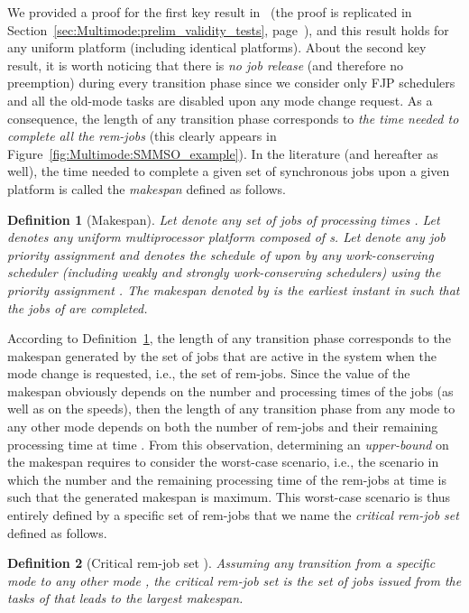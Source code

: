 \documentclass{article}
\newtheorem{Definition}{Definition}
\newtheorem{validity test}{Validity Test}
\begin{document}
We provided a proof for the first key result in~\cite{NelisGoossensAndersson:09} (the proof is replicated in Section~\ref{sec:Multimode:prelim_validity_tests}, page~\pageref{lem:Multimode:remjobs_meet_deadline}), and this result holds for any uniform platform (including identical platforms). About the second key result, it is worth noticing that there is \emph{no job release} (and therefore no preemption) during every transition phase since we consider only FJP schedulers and all the old-mode tasks are disabled upon any mode change request. As a consequence, the length of any transition phase corresponds to \emph{the time needed to complete all the rem-jobs} (this clearly appears in Figure~\ref{fig:Multimode:SMMSO_example}). In the literature (and hereafter as well), the time needed to complete a given set of synchronous jobs upon a given platform is called the \emph{makespan} defined as follows.

\begin{Definition}[Makespan]
\label{def:Multimode:makespan}
Let  denote any set of  jobs of processing times . Let  denotes any uniform multiprocessor platform composed of  s. Let  denote any job priority assignment and  denotes the schedule of  upon  by any work-conserving scheduler (including weakly and strongly work-conserving schedulers) using the priority assignment . The makespan denoted by  is the earliest instant in  such that the  jobs of  are completed. 
\end{Definition}

According to Definition~\ref{def:Multimode:makespan}, the length of any transition phase corresponds to the makespan generated by the set of jobs that are active in the system when the mode change is requested, i.e., the set of rem-jobs. Since the value of the makespan obviously depends on the number and processing times of the jobs (as well as on the  speeds), then the length of any transition phase from any mode  to any other mode  depends on both the number of rem-jobs and their remaining processing time at time . From this observation, determining an \emph{upper-bound} on the makespan requires to consider the worst-case scenario, i.e., the scenario in which the number and the remaining processing time of the rem-jobs at time  is such that the generated makespan is maximum. This worst-case scenario is thus entirely defined by a specific set of rem-jobs that we name the \emph{critical rem-job set} defined as follows.

\begin{Definition}[Critical rem-job set ]
\label{def:Multimode:worst_case_configuration}
Assuming any transition from a specific mode  to any other mode , the critical rem-job set  is the set of jobs issued from the tasks of  that leads to the largest makespan. 
\end{Definition}
\end{document}
